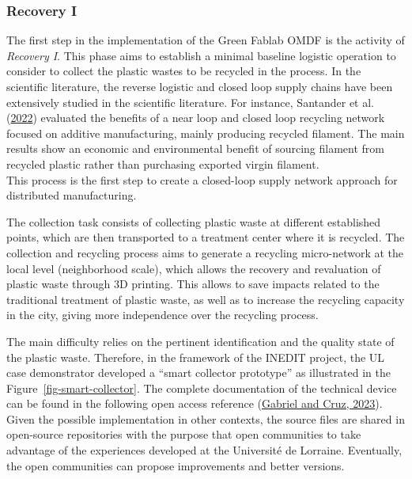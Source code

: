 \documentclass[
  11pt,
]{article}
\begin{document}
\hypertarget{recovery-i}{%
\subsubsection{Recovery I}\label{recovery-i}}

The first step in the implementation of the Green Fablab OMDF is the
activity of \emph{Recovery I}. This phase aims to establish a minimal
baseline logistic operation to consider to collect the plastic wastes to
be recycled in the process. In the scientific literature, the reverse
logistic and closed loop supply chains have been extensively studied in
the scientific literature. For instance, Santander et al.
(\protect\hyperlink{ref-Santander2022}{2022}) evaluated the benefits of
a near loop and closed loop recycling network focused on additive
manufacturing, mainly producing recycled filament. The main results show
an economic and environmental benefit of sourcing filament from recycled
plastic rather than purchasing exported virgin filament.\\
This process is the first step to create a closed-loop supply network
approach for distributed manufacturing.

The collection task consists of collecting plastic waste at different
established points, which are then transported to a treatment center
where it is recycled. The collection and recycling process aims to
generate a recycling micro-network at the local level (neighborhood
scale), which allows the recovery and revaluation of plastic waste
through 3D printing. This allows to save impacts related to the
traditional treatment of plastic waste, as well as to increase the
recycling capacity in the city, giving more independence over the
recycling process.

The main difficulty relies on the pertinent identification and the
quality state of the plastic waste. Therefore, in the framework of the
INEDIT project, the UL case demonstrator developed a ``smart collector
prototype'' as illustrated in the Figure~\ref{fig-smart-collector}. The
complete documentation of the technical device can be found in the
following open access reference
(\protect\hyperlink{ref-gabriel2023}{Gabriel and Cruz, 2023}). Given the
possible implementation in other contexts, the source files are shared
in open-source repositories with the purpose that open communities to
take advantage of the experiences developed at the Université de
Lorraine. Eventually, the open communities can propose improvements and
better versions.
\end{document}
